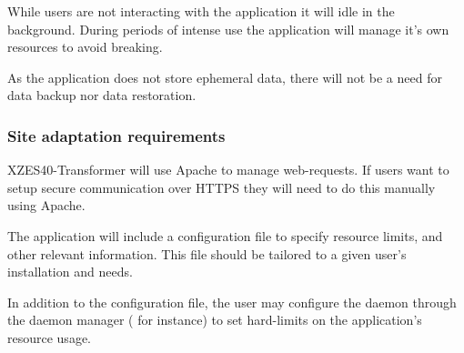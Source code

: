 While users are not interacting with the application it will idle in the background.
During periods of intense use the application will manage it's own resources to avoid breaking.

As the application does not store ephemeral data, there will not be a need for data backup nor data restoration.

\subsubsection{Site adaptation requirements}

XZES40-Transformer will use Apache to manage web-requests.
If users want to setup secure communication over HTTPS they will need to do this manually using Apache.

The application will include a configuration file to specify resource limits, and other relevant information.
This file should be tailored to a given user's installation and needs.

In addition to the configuration file, the user may configure the daemon through the daemon manager ( for instance) to set hard-limits on the application's resource usage.


